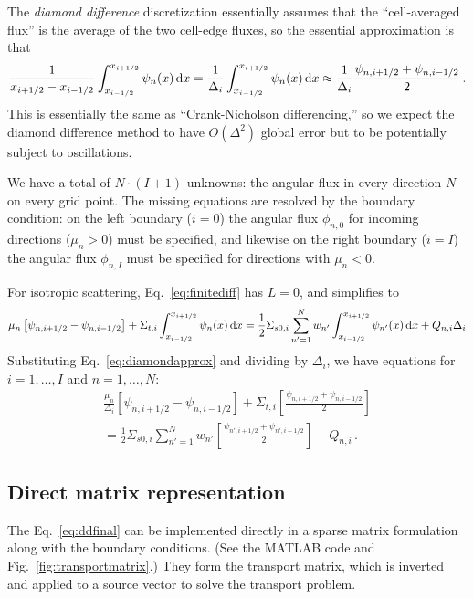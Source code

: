\documentclass[11pt]{article}
\begin{document}
The \emph{diamond difference} discretization essentially assumes that the
``cell-averaged flux'' is the average of the two cell-edge fluxes, so the
essential approximation is that
\begin{equation}
  \frac{1}{x_{i+1/2} - x_{i-1/2}} \int_{x_{i-1/2}}^{x_{i+1/2}} \psi_{n}(x) \mathop{}\!\mathrm{d} x
 = \frac{1}{\Delta_i} \int_{x_{i-1/2}}^{x_{i+1/2}} \psi_{n}(x) \mathop{}\!\mathrm{d} x
\approx  \frac{1}{\Delta_i} \frac{\psi_{n,i+1/2} + \psi_{n,i-1/2}}{2} 
\,.
  \label{eq:diamondapprox}
\end{equation}
This is essentially the same as ``Crank-Nicholson differencing,'' so we expect
the diamond difference method to have $O(\Delta^2)$ global error but to be
potentially subject to oscillations.

We have a total of $N\cdot(I+1)$ unknowns: the angular flux in every
direction $N$ on every grid point. The missing equations are resolved by the
boundary condition: on the left boundary ($i=0$) the angular flux $\phi_{n,0}$
for incoming directions ($\mu_n > 0$) must be specified, and likewise on the
right boundary ($i=I$) the angular flux $\phi_{n,I}$ must be specified
for directions with $\mu_n < 0$.

For isotropic scattering, Eq.~\eqref{eq:finitediff} has $L=0$, and simplifies to
$$
 \mu_n \left[ \psi_{n,i+1/2} - \psi_{n,i-1/2} \right] + \Sigma_{t,i}
  \int_{x_{i-1/2}}^{x_{i+1/2}} \psi_n(x) \mathop{}\!\mathrm{d} x
= \frac{1}{2} \Sigma_{s0,i} 
 \sum_{n'=1}^{N} w_{n'}  \int_{x_{i-1/2}}^{x_{i+1/2}} \psi_{n'}(x) \mathop{}\!\mathrm{d} x
  + Q_{n,i}  \Delta_i
$$
Substituting Eq.~\eqref{eq:diamondapprox} and dividing by $\Delta_i$, we have equations for
$i=1,\ldots,I$ and $n=1,\ldots,N$:
\begin{multline}
  \frac{\mu_n}{\Delta_i}  \left[ \psi_{n,i+1/2} - \psi_{n,i-1/2} \right]
+ \Sigma_{t,i}  \left[ \frac{\psi_{n,i+1/2} + \psi_{n,i-1/2}}{2} \right]
\\
=
\frac{1}{2} \Sigma_{s0,i}
\sum_{n'=1}^{N} w_{n'} \left[ \frac{\psi_{n',i+1/2} + \psi_{n',i-1/2}}{2} \right]
  + Q_{n,i} \,.
  \label{eq:ddfinal}
\end{multline}

\subsection{Direct matrix representation}
The Eq.~\eqref{eq:ddfinal} can be implemented directly in a sparse matrix
formulation along with the boundary conditions. (See the MATLAB
code and Fig.~\ref{fig:transportmatrix}.)
They form the transport matrix, which is inverted and applied to a source
vector to solve the transport problem.
\end{document}
